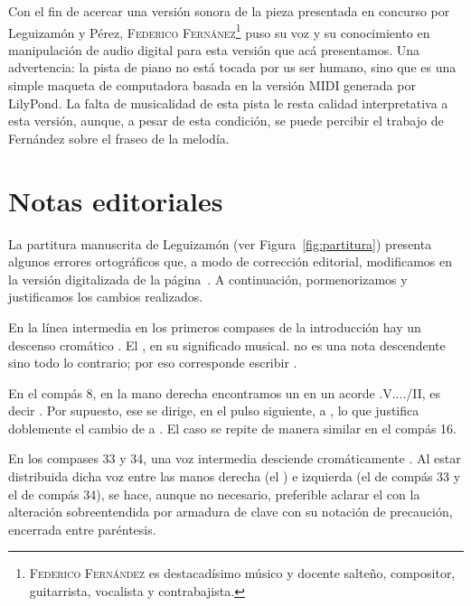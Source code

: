 Con el fin de acercar una versión sonora de la pieza presentada en concurso por Leguizamón y Pérez, \textsc{Federico Fernánez}\footnote{\textsc{Federico Fernández} es destacadísimo músico y docente salteño, compositor, guitarrista, vocalista y contrabajista.} puso su voz y su conocimiento en manipulación de audio digital para esta versión que acá presentamos. Una advertencia: la pista de piano no está tocada por us ser humano, sino que es una simple maqueta de computadora basada en la versión MIDI generada por LilyPond. La falta de musicalidad de esta pista le resta calidad interpretativa a esta versión, aunque, a pesar de esta condición, se puede percibir el trabajo de Fernández sobre el fraseo de la melodía.


\section{Notas editoriales}
\label{sec:notas-editoriales}

La partitura manuscrita de Leguizamón (ver Figura~\ref{fig:partitura}) presenta algunos errores ortográficos que, a modo de corrección editorial, modificamos en la versión digitalizada de la página~\pageref{partitura-digitalizada}. A continuación, pormenorizamos y justificamos los cambios realizados.

En la línea intermedia en los primeros compases de la introducción hay un descenso cromático \hbox{.} El \hbox{,} en su significado musical. no es una nota descendente sino todo lo contrario; por eso corresponde escribir \hbox{.}

En el compás 8, en la mano derecha encontramos un  en un acorde \acorde.V..../II, es decir \hbox{.} Por supuesto, ese  se dirige, en el pulso siguiente, a  \hbox{,} lo que justifica doblemente el cambio de  a . El caso se repite de manera similar en el compás 16.

En los compases 33 y 34, una voz intermedia desciende cromáticamente . Al estar distribuida dicha voz entre las manos derecha (el ) e izquierda (el  de compás 33 y el  de compás 34), se hace, aunque no necesario, preferible aclarar el  con la alteración sobreentendida por armadura de clave con su notación de precaución, encerrada entre paréntesis.

